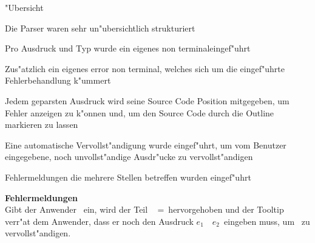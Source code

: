 {
  \begin{itemgroup}{"Ubersicht}
    \item Die Parser waren sehr un"ubersichtlich strukturiert
    \item Pro Ausdruck und Typ wurde ein eigenes \glqq non terminal\grqq eingef"uhrt
    \item Zus"atzlich ein eigenes \glqq error non terminal\grqq, welches sich um
          die eingef"uhrte Fehlerbehandlung k"ummert
    \item Jedem geparsten Ausdruck wird seine Source Code Position mitgegeben, um
          Fehler anzeigen zu k"onnen und, um den Source Code durch die Outline
          markieren zu lassen
    \item Eine automatische Vervollst"andigung wurde eingef"uhrt, um vom Benutzer
          eingegebene, noch unvollst"andige Ausdr"ucke zu vervollst"andigen
    \item Fehlermeldungen die mehrere Stellen betreffen wurden eingef"uhrt
  \end{itemgroup}
}

{
  {\bf Fehlermeldungen}\\[5mm]
  Gibt der Anwender \glqq {}\grqq\ 
  ein, wird der Teil \glqq \KeyLet\  =\grqq\ hervorgehoben und der Tooltip
  verr"at dem Anwender, dass er noch den Ausdruck \glqq $e_1$\ \KeyIn\ $e_2$\grqq\ eingeben muss,
  um \glqq{\bf Let}\grqq\ zu vervollst"andigen.
}